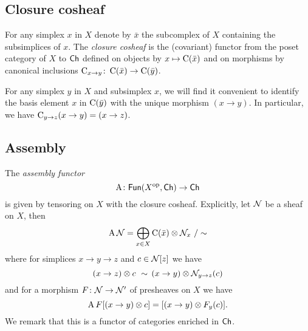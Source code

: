 
\subsection{Closure cosheaf}

For any simplex $x$ in $X$ denote by $\bar x$ the subcomplex of $X$ containing the subsimplices of $x$.
The \textit{closure cosheaf} is the (covariant) functor from the poset category of $X$ to $\mathsf{Ch}$ defined on objects by $x \mapsto \operatorname{C}(\bar x)$ and on morphisms by canonical inclusions $\operatorname{C}_{x \to y} \colon \operatorname{C}(\bar x) \to \operatorname{C}(\bar y)$.

For any simplex $y$ in $X$ and subsimplex $x$, we will find it convenient to identify the basis element $x$ in $\operatorname{C}(\bar y)$ with the unique morphism $(x \to y)$.
In particular, we have $\operatorname{C}_{y \to z} (x \to y) = (x \to z)$.

\subsection{Assembly}\label{ss:assembly}

The \textit{assembly functor}
\[
\operatorname{A} \colon \mathsf{Fun}(X^{\mathrm{op}}, \mathsf{Ch}) \to \mathsf{Ch}
\]
is given by tensoring on $X$ with the closure cosheaf.
Explicitly, let $\mathcal{N}$ be a sheaf on $X$, then
\[
\operatorname{A} \mathcal{N} = \bigoplus_{x \in X} \operatorname{C}(\bar x) \otimes \mathcal{N}_x \ / \sim
\]
where for simplices $x \to y \to z$ and $c \in \mathcal{N}[z]$ we have
\[
(x \to z) \otimes c \ \sim \, (x \to y) \otimes \mathcal{N}_{y \to z}(c)
\]
and for a morphism $F \colon \mathcal{N} \to \mathcal{N}'$ of presheaves on $X$ we have
\[
\operatorname{A} F[(x \to y) \otimes c] = [(x \to y) \otimes F_y(c)].
\]
We remark that this is a functor of categories enriched in $\mathsf{Ch}$.

